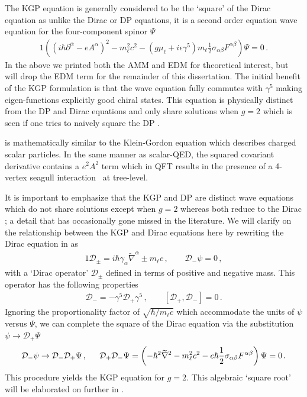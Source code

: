 The KGP equation is generally considered to be the `square' of the Dirac equation as unlike the Dirac or DP equations, it is a second order equation wave equation for the four-component spinor $\Psi$
\begin{alignat}{1}
	\label{kgp:1} \left((i\hbar\partial^{\alpha}-eA^{\alpha})^{2}-m_{\ell}^{2}c^{2}-\left(g\mu_{\ell}+i\epsilon\gamma^{5}\right)m_{\ell}\frac{1}{2}\sigma_{\alpha\beta}F^{\alpha\beta}\right)\Psi=0\,.
\end{alignat}
In the above we printed both the AMM and EDM for theoretical interest, but will drop the EDM term for the remainder of this dissertation. The initial benefit of the KGP formulation is that the wave equation fully commutes with $\gamma^{5}$ making eigen-functions explicitly good chiral states. This equation is physically distinct from the DP and Dirac equations and only share solutions when $g\!=\!2$ which is seen if one tries to na{\"i}vely square the DP .

 is mathematically similar to the Klein-Gordon equation which describes charged scalar particles. In the same manner as scalar-QED, the squared covariant derivative contains a $e^{2}A^{2}$ term which in QFT results in the presence of a 4-vertex seagull interaction~\citep{Schwartz:2014sze} at tree-level.

It is important to emphasize that the KGP  and DP  are distinct wave equations which do not share solutions except when $g\!=\!2$ whereas both reduce to the Dirac ; a detail that has occasionally gone missed in the literature. We will clarify on the relationship between the KGP and Dirac equations here by rewriting the Dirac equation in  as
\begin{alignat}{1}
	\label{do:1} \mathcal{D}_{\pm}=i\hbar\gamma_{\alpha}\widetilde\nabla^{\alpha}\pm m_{\ell}c\,,\qquad
    \mathcal{D}_{-}\psi=0\,,
\end{alignat}
with a `Dirac operator' $\mathcal{D}_{\pm}$ defined in terms of positive and negative mass. This operator has the following properties
\begin{gather}
    \label{do:2}
    \mathcal{D}_{-}=-\gamma^{5}\mathcal{D}_{+}\gamma^{5}\,,\qquad
    [\mathcal{D}_{+},\mathcal{D}_{-}]=0\,.
\end{gather}
Ignoring the proportionality factor of $\sqrt{\hbar/m_{\ell}c}$ which accommodate the units of $\psi$ versus $\Psi$, we can complete the square of the Dirac equation via the substitution $\psi\rightarrow\mathcal{D}_{+}\Psi$
\begin{alignat}{1}
	\label{do:3} \mathcal{D}_{-}\psi\rightarrow\mathcal{D}_{-}\mathcal{D}_{+}\Psi\,,\indent\mathcal{D}_{+}\mathcal{D}_{-}\Psi=\left(-\hbar^{2}\widetilde\nabla^{2}-m_{\ell}^{2}c^{2}-e\hbar\frac{1}{2}\sigma_{\alpha\beta}F^{\alpha\beta}\right)\Psi=0\,.
\end{alignat}
This procedure yields the KGP equation for $g\!=\!2$. This algebraic `square root' will be elaborated on further in .

